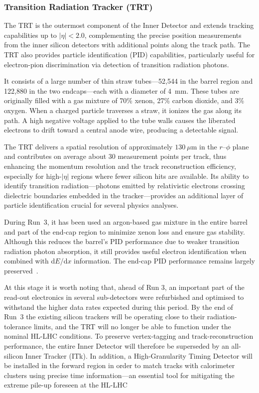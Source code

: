 \subsubsection*{Transition Radiation Tracker (TRT)}

The TRT is the outermost component of the Inner Detector and extends tracking capabilities up to $|\eta| < 2.0$, complementing the precise position measurements from the inner silicon detectors with additional points along the track path. The TRT also provides particle identification (PID) capabilities, particularly useful for electron-pion discrimination via detection of transition radiation photons.

It consists of a large number of thin straw tubes—52,544 in the barrel region and 122,880 in the two endcaps—each with a diameter of 4~mm. These tubes are originally filled with a gas mixture of 70\% xenon, 27\% carbon dioxide, and 3\% oxygen. When a charged particle traverses a straw, it ionizes the gas along its path. A high negative voltage applied to the tube walls causes the liberated electrons to drift toward a central anode wire, producing a detectable signal. 

The TRT delivers a spatial resolution of approximately $130~\mu\text{m}$ in the $r\text{--}\phi$ plane and contributes on average about 30 measurement points per track, thus enhancing the momentum resolution and the track reconstruction efficiency, especially for high-$|\eta|$ regions where fewer silicon hits are available. Its ability to identify transition radiation—photons emitted by relativistic electrons crossing dielectric boundaries embedded in the tracker—provides an additional layer of particle identification crucial for several physics analyses.

During Run~3, it has been used an argon-based gas mixture in the entire barrel and part of the end-cap region to minimize xenon loss and ensure gas stability. Although this reduces the barrel's PID performance due to weaker transition radiation photon absorption, it still provides useful electron identification when combined with d$E$/d$x$ information. The end-cap PID performance remains largely preserved~\cite{ATLAS_run3}.

\vspace{-0.3}
At this stage it is worth noting that, ahead of Run 3, an important part of the read-out electronics in several sub-detectors were refurbished and optimised to withstand the higher data rates expected during this period. By the end of Run~3 the existing silicon trackers will be operating close to their radiation-tolerance limits, and the TRT will no longer be able to function under the nominal HL-LHC conditions. To preserve vertex-tagging and track-reconstruction performance, the entire Inner Detector will therefore be superseded by an all-silicon Inner Tracker (ITk). In addition, a High-Granularity Timing Detector will be installed in the forward region in order to match tracks with calorimeter clusters using precise time information—an essential tool for mitigating the extreme pile-up foreseen at the HL-LHC \cite{ATLAS:1502664}

